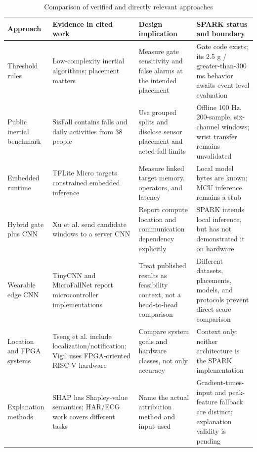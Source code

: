 \begin{table}[htbp]
\centering\small
\caption{Comparison of verified and directly relevant approaches}
\label{tab:literature-comparison}
\begin{tabular}{p{2.4cm}p{3.0cm}p{3.3cm}p{3.4cm}}
\hline
Approach & Evidence in cited work & Design implication & SPARK status and boundary \\
\hline
Threshold rules & Low-complexity inertial algorithms; placement matters \cite{kangas2008comparison,bourke2008threshold} & Measure gate sensitivity and false alarms at the intended placement & Gate code exists; its 2.5 g / greater-than-300 ms behavior awaits event-level evaluation \\
Public inertial benchmark & SisFall contains falls and daily activities from 38 people \cite{sucerquia2017sisfall} & Use grouped splits and disclose sensor placement and acted-fall limits & Offline 100 Hz, 200-sample, six-channel windows; wrist transfer remains unvalidated \\
Embedded runtime & TFLite Micro targets constrained embedded inference \cite{david2021tensorflow} & Measure linked target memory, operators, and latency & Local model bytes are known; MCU inference remains a stub \\
Hybrid gate plus CNN & Xu et al. send candidate windows to a server CNN \cite{xu2021fusion} & Report compute location and communication dependency explicitly & SPARK intends local inference, but has not demonstrated it on hardware \\
Wearable edge CNN & TinyCNN and MicroFallNet report microcontroller implementations \cite{yu2023tinycnn,hu2025microfallnet} & Treat published results as feasibility context, not a head-to-head comparison & Different datasets, placements, models, and protocols prevent direct score comparison \\
Location and FPGA systems & Tseng et al. include localization/notification; Vigil uses FPGA-oriented RISC-V hardware \cite{sensors2025wearable,vigil2024fpga} & Compare system goals and hardware classes, not only accuracy & Context only; neither architecture is the SPARK implementation \\
Explanation methods & SHAP has Shapley-value semantics; HAR/ECG work covers different tasks \cite{lundberg2017shap,liu2024explainable,yao2021interpretation,kundu2025explainable} & Name the actual attribution method and input used & Gradient-times-input and peak-feature fallback are distinct; explanation validity is pending \\
\hline
\end{tabular}
\end{table}

